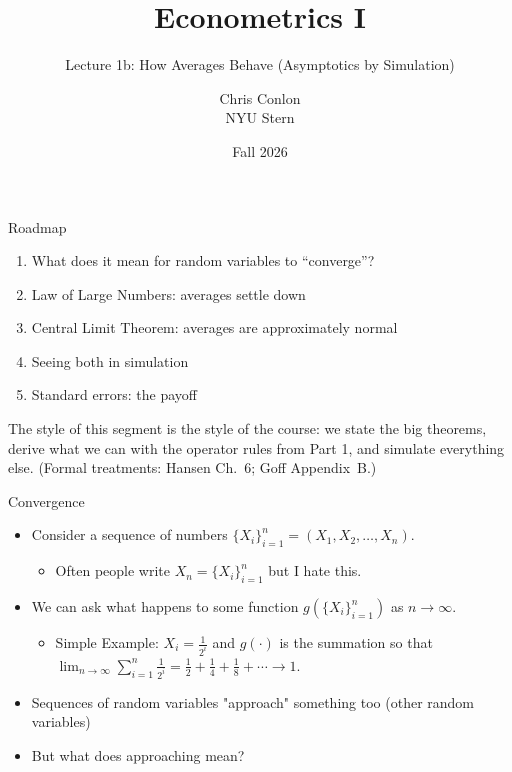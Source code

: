 \documentclass[aspectratio=169,11pt]{beamer}
\title{Econometrics I}
\subtitle{Lecture 1b: How Averages Behave (Asymptotics by Simulation)}
\author{Chris Conlon \\NYU Stern}
\date{Fall 2026}
\begin{document}
\maketitle


\begin{frame}{Roadmap}
\begin{enumerate}
	\item What does it mean for random variables to ``converge''?
	\item Law of Large Numbers: averages settle down
	\item Central Limit Theorem: averages are approximately normal
	\item Seeing both in simulation
	\item Standard errors: the payoff
\end{enumerate}
\bigskip
The style of this segment is the style of the course: we \alert{state} the big theorems,
\alert{derive} what we can with the operator rules from Part 1, and \alert{simulate}
everything else. (Formal treatments: Hansen Ch.~6; Goff Appendix~B.)
\end{frame}

\begin{frame}{Convergence}
\begin{itemize}
	\item Consider a sequence of numbers $\{X_i\}_{i=1}^n = \left(X_1,X_2,\ldots,X_n\right)$.
	\begin{itemize}
		\item Often people write $X_n =  \{X_i\}_{i=1}^n$ but I hate this.
	\end{itemize}
	\item We can ask what happens to some function $g(\{X_i\}_{i=1}^n)$ as $n \rightarrow \infty$.
	\begin{itemize}
		\item Simple Example: $X_i = \frac{1}{2^i}$ and $g(\cdot)$ is the summation so that $\lim_{n \rightarrow \infty}\sum_{i=1}^n \frac{1}{2^i} =  \frac{1}{2} + \frac{1}{4} + \frac{1}{8} + \cdots \rightarrow 1$.
	\end{itemize}
	\item Sequences of \alert{random variables} "approach" something too (other \alert{random variables})
	\item But what does \alert{approaching} mean?
\end{itemize}
\end{frame}
\end{document}

